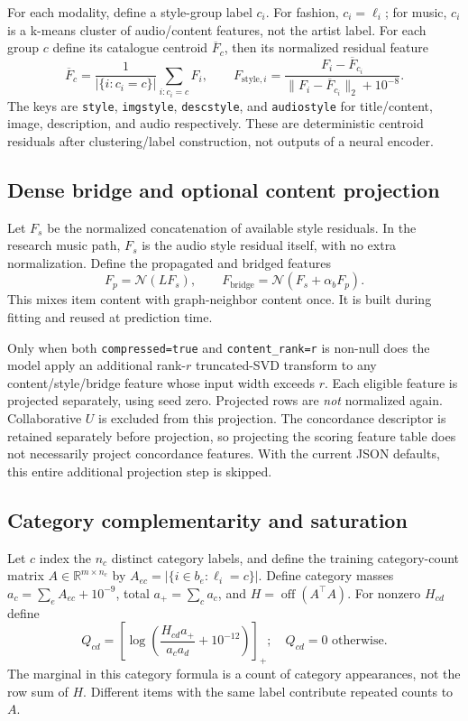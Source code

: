 \documentclass[11pt,a4paper]{article}
\newcommand{\code}[1]{\nolinkurl{#1}}
\newcommand{\R}{\mathbb R}
\newcommand{\off}{\operatorname{off}}
\newcommand{\pos}[1]{\left[#1\right]_+}
\newcommand{\normrows}{\mathcal N}
\numberwithin{equation}{section}
\begin{document}
For each modality, define a style-group label $c_i$. For fashion, $c_i=\ell_i$; for music,
$c_i$ is a k-means cluster of audio/content features, not the artist label. For each group
$c$ define its catalogue centroid $\overline F_c$, then its normalized residual feature
\begin{equation}\label{eq:style}
 \overline F_c=\frac{1}{|\{i:c_i=c\}|}\sum_{i:c_i=c}F_i,
 \qquad F_{\mathrm{style},i}
 =\frac{F_i-\overline F_{c_i}}{\lVert F_i-\overline F_{c_i}\rVert_2+10^{-8}}.
\end{equation}
The keys are \code{style}, \code{imgstyle}, \code{descstyle}, and \code{audiostyle}
for title/content, image, description, and audio respectively. These are deterministic
centroid residuals after clustering/label construction, not outputs of a neural encoder.

\subsection{Dense bridge and optional content projection}
Let $F_s$ be the normalized concatenation of available style residuals. In the research
music path, $F_s$ is the audio style residual itself, with no extra normalization.
Define the propagated and bridged features
\begin{equation}\label{eq:bridge}
 F_p=\normrows(LF_s),\qquad
 F_{\mathrm{bridge}}=\normrows(F_s+\alpha_b F_p).
\end{equation}
This mixes item content with graph-neighbor content once. It is built during fitting and
reused at prediction time.

Only when both \code{compressed=true} and \code{content_rank=r} is non-null does the model
apply an additional rank-$r$ truncated-SVD transform to any content/style/bridge feature
whose input width exceeds $r$. Each eligible feature is projected separately, using seed
zero. Projected rows are \emph{not} normalized again. Collaborative $U$ is excluded from
this projection. The concordance descriptor is retained separately before projection,
so projecting the scoring feature table does not necessarily project concordance features.
With the current JSON defaults, this entire additional projection step is skipped.

\subsection{Category complementarity and saturation}
Let $c$ index the $n_c$ distinct category labels, and define the training category-count
matrix $A\in\R^{m\times n_c}$ by $A_{ec}=|\{i\in b_e:\ell_i=c\}|$.
Define category masses $a_c=\sum_e A_{ec}+10^{-9}$, total $a_+=\sum_c a_c$, and
$H=\off(A^\top A)$. For nonzero $H_{cd}$ define
\begin{equation}\label{eq:catpmi}
 Q_{cd}=\pos{\log\left(\frac{H_{cd}a_+}{a_c a_d}+10^{-12}\right)};
 \quad Q_{cd}=0\text{ otherwise}.
\end{equation}
The marginal in this category formula is a count of category appearances, not the row sum
of $H$. Different items with the same label contribute repeated counts to $A$.
\end{document}
